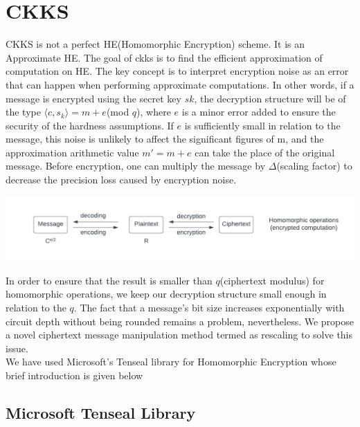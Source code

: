 \documentclass{article}
\begin{document}
\section{CKKS}
\noindent CKKS is not a perfect HE(Homomorphic Encryption) scheme. It is an Approximate HE. The goal of ckks is to find the efficient approximation of computation on HE. The key concept is to interpret encryption noise as an error that can happen when performing approximate computations. In other words, if a message is encrypted using the secret key $sk$, the decryption structure will be of the type $\langle c, s_k \rangle = m + e $(mod $q$), where $e$ is a minor error added to ensure the security of the hardness assumptions. If $e$ is sufficiently small in relation to the message, this noise is unlikely to affect the significant figures of m, and the approximation arithmetic value $m' = m + e$ can take the place of the original message. Before encryption, one can multiply the message by $\Delta$(scaling factor)  to decrease the precision loss caused by encryption noise.


\begin{center}
    \includegraphics[scale = 0.6]{Crypto_Img_1.png}
\end{center}

\noindent In order to ensure that the result is smaller than $q$(ciphertext modulus) for homomorphic operations, we keep our decryption structure small enough in relation to the $q$. The fact that a message's bit size increases exponentially with circuit depth without being rounded remains a problem, nevertheless. We propose a novel ciphertext message manipulation method termed as rescaling to solve this issue.   \\

\noindent We have used Microsoft’s Tenseal library for Homomorphic Encryption whose brief introduction is given below

\subsection{Microsoft Tenseal Library}
\end{document}
